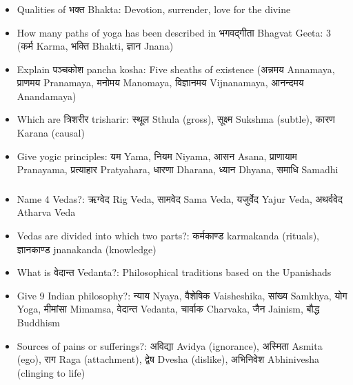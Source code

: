 \begin{frame}[fragile]\frametitle{}
\begin{itemize}
\item Qualities of भक्त Bhakta: Devotion, surrender, love for the divine
\item How many paths of yoga has been described in भगवद्गीता Bhagvat Geeta: 3 (कर्म Karma, भक्ति Bhakti, ज्ञान Jnana)
\item Explain पञ्चकोश pancha kosha: Five sheaths of existence (अन्नमय Annamaya, प्राणमय Pranamaya, मनोमय Manomaya, विज्ञानमय Vijnanamaya, आनन्दमय Anandamaya)
\item Which are त्रिशरीर trisharir: स्थूल Sthula (gross), सूक्ष्म Sukshma (subtle), कारण Karana (causal)
\item Give yogic principles: यम Yama, नियम Niyama, आसन Asana, प्राणायाम Pranayama, प्रत्याहार Pratyahara, धारणा Dharana, ध्यान Dhyana, समाधि Samadhi
\end{itemize}
\end{frame}

\begin{frame}[fragile]\frametitle{}
\begin{itemize}
\item Name 4 Vedas?: ऋग्वेद Rig Veda, सामवेद Sama Veda, यजुर्वेद Yajur Veda, अथर्ववेद Atharva Veda
\item Vedas are divided into which two parts?: कर्मकाण्ड karmakanda (rituals), ज्ञानकाण्ड jnanakanda (knowledge)
\item What is वेदान्त Vedanta?: Philosophical traditions based on the Upanishads
\item Give 9 Indian philosophy?: न्याय Nyaya, वैशेषिक Vaisheshika, सांख्य Samkhya, योग Yoga, मीमांसा Mimamsa, वेदान्त Vedanta, चार्वाक Charvaka, जैन Jainism, बौद्ध Buddhism
\item Sources of pains or sufferings?: अविद्या Avidya (ignorance), अस्मिता Asmita (ego), राग Raga (attachment), द्वेष Dvesha (dislike), अभिनिवेश Abhinivesha (clinging to life)
\end{itemize}
\end{frame}

